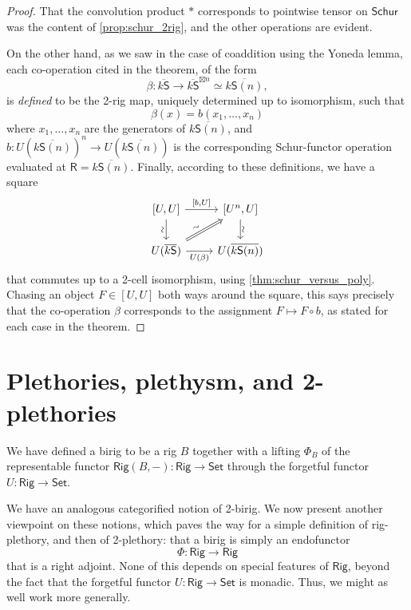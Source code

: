 \documentclass[12pt,reqno]{amsart}
\theoremstyle{plain}
\theoremstyle{definition}
\theoremstyle{remark}
\newcommand{\maps}{\colon}
\newcommand{\category}[1]{\mathsf{#1}}
\newcommand{\R}{\category R}
\renewcommand{\S}{\category S}
\newcommand{\namedcat}[1]{\mathsf{#1}}
\newcommand{\Rig}{\namedcat{Rig}}
\newcommand{\Set}{\namedcat{Set}}
\newcommand{\Schur}{\namedcat{Schur}}
\newcommand{\ksbar}{\overline{k\S}}
\numberwithin{thm}{section}
\begin{document}
\begin{proof}
That the convolution product $\ast$ corresponds to pointwise tensor on $\Schur$ was the content of \cref{prop:schur_2rig}, and the other operations are evident. 

On the other hand, as we saw in the case of coaddition using the Yoneda lemma, each co-operation cited in the theorem, of the form
\[   
    \beta \maps \ksbar \to \ksbar^{\boxtimes n}\simeq \overline{k\S(n)}, 
\]
is \emph{defined} to be the 2-rig map, uniquely determined up to isomorphism, such that 
\[
    \beta(x) = b(x_1, \ldots, x_n)
\]
where $x_1, \ldots, x_n$ are the generators of $\overline{k\S(n)}$, and $b \maps U(\overline{k\S(n)})^n \longrightarrow  U(\overline{k\S(n)})$ is the corresponding Schur-functor operation evaluated at $\R = \overline{k\S(n)}$. Finally, according to these definitions, we have a square 
\[  
\begin{tikzcd}
    {[U, U]}
    \arrow[d, "\sim" {anchor=south, rotate=90, inner sep=.5mm}, swap]  
    \arrow[r, "{[b, U]}"] 
    &
    {[U^n, U]}
    \arrow[d, "\sim" {anchor=north, rotate=90, inner sep=.5mm}] 
    \\
     U(\ksbar) 
    \arrow[ur, Rightarrow, "\sim" {rotate=20, inner sep=1mm}]
    \arrow[r, swap, "U(\beta)"] 
    &
    U(\overline{k\S(n)})
\end{tikzcd}
 \]
that commutes up to a 2-cell isomorphism, using \cref{thm:schur_versus_poly}. Chasing an object $F \in [U, U]$ both ways around the square, this says precisely that the co-operation $\beta$ corresponds to the assignment $F \mapsto F \circ b$, as stated for each case in the theorem. \end{proof}

\section{Plethories, plethysm, and 2-plethories}
\label{sec:plethysm}

We have defined a birig to be a rig $B$ together with a lifting $\Phi_B$ of the representable functor $\Rig(B, -) \maps \Rig \to \Set$ through the forgetful functor $U \maps \Rig \to \Set$. 

We have an analogous categorified notion of 2-birig. We now present another viewpoint on these notions, which paves the way for a simple definition of rig-plethory, and then of 2-plethory: that a birig is simply an endofunctor
\[
    \Phi \maps \Rig \to \Rig
\]
that is a right adjoint. None of this depends on special features of $\Rig$, beyond the fact that the forgetful functor $U \maps \Rig \to \Set$ is monadic. Thus, we might as well work more generally.
\end{document}
